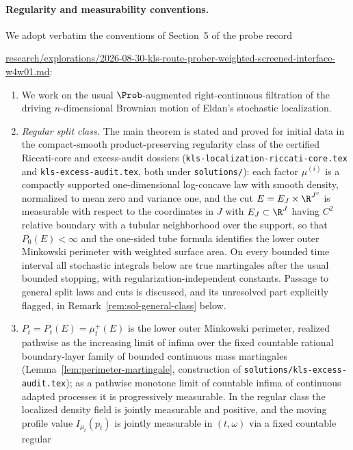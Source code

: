 \documentclass[../main.tex]{subfiles}
\begin{document}
\paragraph{Regularity and measurability conventions.}
We adopt verbatim the conventions of Section~5 of the probe record
\begin{center}
\url{research/explorations/2026-08-30-kls-route-prober-weighted-screened-interface-w4w01.md}:
\end{center}
\begin{enumerate}[label=(M\arabic*),leftmargin=3em]
  \item We work on the usual $\Prob$-augmented right-continuous filtration of the driving
  $n$-dimensional Brownian motion of Eldan's stochastic localization.
  \item \emph{Regular split class.}  The main theorem is stated and proved for initial data
  in the compact-smooth product-preserving regularity class of the certified Riccati-core and
  excess-audit dossiers (\texttt{kls-localization-riccati-core.tex} and
  \texttt{kls-excess-audit.tex}, both under \texttt{solutions/}): each
  factor $\mu^{(i)}$ is a compactly supported
  one-dimensional log-concave law with smooth density, normalized to mean zero and variance
  one, and the cut $E=E_J\times\R^{J^c}$ is measurable with respect to the coordinates in $J$
  with $E_J\subset\R^{J}$ having $C^2$ relative boundary with a tubular neighborhood over the
  support, so that $P_0(E)<\infty$ and the one-sided tube formula identifies the lower outer
  Minkowski perimeter with weighted surface area.  On every bounded time interval all
  stochastic integrals below are true martingales after the usual bounded stopping, with
  regularization-independent constants.  Passage to general split laws and cuts is discussed,
  and its unresolved part explicitly flagged, in
  Remark~\ref{rem:sol-general-class} below.
  \item $P_t=P_t(E)=\mu_t^+(E)$ is the lower outer Minkowski perimeter, realized pathwise as
  the increasing limit of infima over the fixed countable rational boundary-layer family of
  bounded continuous mass martingales (Lemma~\ref{lem:perimeter-martingale}, construction of
  \texttt{solutions/kls-excess-audit.tex}); as a pathwise monotone limit of countable infima of
  continuous adapted processes it is progressively measurable.  In the regular class the
  localized density field is jointly measurable and positive, and the moving profile value
  $I_{\mu_t}(p_t)$ is jointly measurable in $(t,\omega)$ via a fixed countable regular

\end{enumerate}
\end{document}

